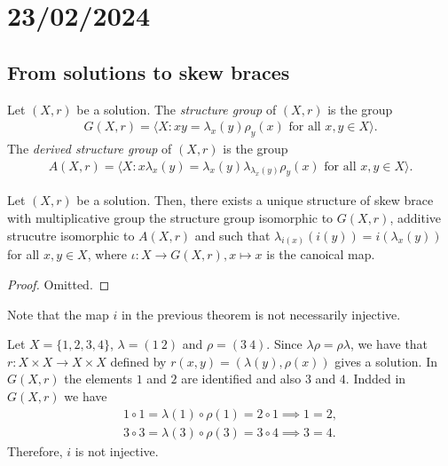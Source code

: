 \section{23/02/2024}

\subsection{From solutions to skew braces}

    \begin{definition}
        Let $(X,r)$ be a solution. The \emph{structure group} of $(X,r)$ is the group
        \begin{align*}
            G(X,r)=\langle X : xy=\lambda_x(y)\rho_y(x) \text{ for all }x,y\in X \rangle.
        \end{align*}
        The \emph{derived structure group} of $(X,r)$ is the group
        \begin{align*} 
            A(X,r)=\langle X : x\lambda_x(y)=\lambda_x(y)\lambda_{\lambda_x(y)}\rho_y(x) \text{ for all }x,y\in X \rangle.
        \end{align*}
    \end{definition}

        
    \begin{theorem}\label{thm:structuregroup}
    Let $(X,r)$ be a solution.
    Then, there exists a unique structure of skew brace with multiplicative group the structure group isomorphic to $G(X,r)$, additive strucutre isomorphic to $A(X,r)$ and such that $\lambda_{i(x)}(i(y))=i(\lambda_x(y))$ for all $x,y\in X$, where $\iota: X\to G(X,r), x\mapsto x$ is the canoical map. 
    \end{theorem}

    \begin{proof}
        Omitted.
    \end{proof}

    Note that the map $i$ in the previous theorem is not necessarily injective.

    \begin{example}
        Let $X=\{1,2,3,4\}$, $\lambda= (1\ 2)$ and $\rho=(3\ 4)$. Since $\lambda\rho=\rho\lambda$, we have that $r:X\times X\to X \times X$ defined by $r(x,y)=(\lambda(y),\rho(x))$ gives a solution. In $G(X,r)$ the elements $1$ and $2$ are identified and also $3$ and $4$. Indded in $G(X,r)$ we have 
        \begin{align*}
            1\circ 1 = \lambda(1)\circ \rho(1) = 2 \circ 1 \implies 1 = 2,\\
            3\circ 3 = \lambda(3)\circ \rho(3) = 3 \circ 4 \implies 3=4.
        \end{align*}
        Therefore, $i$ is not injective. 
    \end{example}

